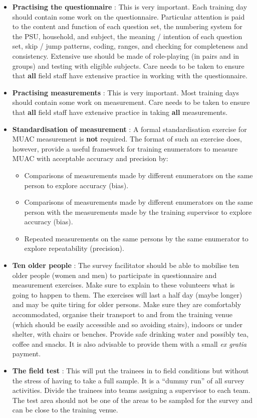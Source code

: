 \documentclass[12pt,a4paper]{book}
\theoremstyle{definition}
\theoremstyle{definition}
\theoremstyle{definition}
\theoremstyle{remark}
\begin{document}
\begin{itemize}
\item
  \textbf{Practising the questionnaire} : This is very important. Each
  training day should contain some work on the questionnaire. Particular
  attention is paid to the content and function of each question set,
  the numbering system for the PSU, household, and subject, the meaning
  / intention of each question set, skip / jump patterns, coding,
  ranges, and checking for completeness and consistency. Extensive use
  should be made of role-playing (in pairs and in groups) and testing
  with eligible subjects. Care needs to be taken to ensure that
  \textbf{all} field staff have extensive practice in working with the
  questionnaire.
\item
  \textbf{Practising measurements} : This is very important. Most
  training days should contain some work on measurement. Care needs to
  be taken to ensure that \textbf{all} field staff have extensive
  practice in taking \textbf{all} measurements.
\item
  \textbf{Standardisation of measurement} : A formal standardisation
  exercise for MUAC measurement is \textbf{not} required. The format of
  such an exercise does, however, provide a useful framework for
  training enumerators to measure MUAC with acceptable accuracy and
  precision by:

  \begin{itemize}
  \item
    Comparisons of measurements made by different enumerators on the
    same person to explore accuracy (bias).
  \item
    Comparisons of measurements made by different enumerators on the
    same person with the measurements made by the training supervisor to
    explore accuracy (bias).
  \item
    Repeated measurements on the same persons by the same enumerator to
    explore repeatability (precision).
  \end{itemize}
\item
  \textbf{Ten older people} : The survey facilitator should be able to
  mobilise ten older people (women and men) to participate in
  questionnaire and measurement exercises. Make sure to explain to these
  volunteers what is going to happen to them. The exercises will last a
  half day (maybe longer) and may be quite tiring for older persons.
  Make sure they are comfortably accommodated, organise their transport
  to and from the training venue (which should be easily accessible and
  so avoiding stairs), indoors or under shelter, with chairs or benches.
  Provide safe drinking water and possibly tea, coffee and snacks. It is
  also advisable to provide them with a small \emph{ex gratia} payment.
\item
  \textbf{The field test} : This will put the trainees in to field
  conditions but without the stress of having to take a full sample. It
  is a ``dummy run'' of all survey activities. Divide the trainees into
  teams assigning a supervisor to each team. The test area should not be
  one of the areas to be sampled for the survey and can be close to the
  training venue.
\end{itemize}
\end{document}
